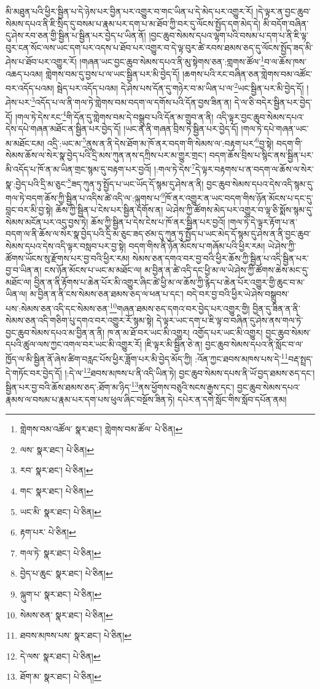 མི་མཐུན་པའི་ཕྱིར་སྦྱིན་པ་དེ་ཉེས་པར་བྱིན་པར་འགྱུར་བ་གང་ཡིན་པ་དེ་མེད་པར་འགྱུར་རོ། །དེ་ལྟར་ན་བྱང་ཆུབ་སེམས་དཔའ་ནི་ཇི་སྲིད་དུ་བསམ་པ་རྣམ་པར་དག་པ་མ་ཐོབ་ཀྱི་བར་དུ་ལོངས་སྤྱོད་དག་མེད་དེ། མི་བདོག་བཞིན་དུ་ཤེས་རབ་ཅན་གྱི་སྦྱིན་པ་སྦྱིན་པར་བྱེད་པ་ཡིན་ནོ། །བྱང་ཆུབ་སེམས་དཔའ་ལྷག་པའི་བསམ་པ་དག་པ་ནི་ཇི་ལྟ་བུར་ངན་སོང་ལས་ཡང་དག་པར་འདས་པ་ཐོབ་པར་འགྱུར་བ་དེ་ལྟ་བུར་ཚེ་རབས་ཐམས་ཅད་དུ་ལོངས་སྤྱོད་ཟད་མི་ཤེས་པ་ཐོབ་པར་འགྱུར་རོ། །གཞན་ཡང་བྱང་ཆུབ་སེམས་དཔའ་ནི་མུ་སྟེགས་ཅན་:གླགས་ཚོལ་\footnote{གླེགས་བམ་འཚོལ་  སྣར་ཐང་། གླེགས་བམ་ཚོལ་  པེ་ཅིན། }བ་ལ་ཆོས་ཁས་འཆད་པའམ། གླེགས་བམ་དུ་བྱས་པ་ལ་ཡང་སྦྱིན་པར་མི་བྱེད་དོ། །ཆགས་པའི་རང་བཞིན་ཅན་གླེགས་བམ་འཚོང་བར་འདོད་པའམ། སྦེད་པར་འདོད་པའམ། དེ་ཤེས་པས་དོན་དུ་གཉེར་བ་མ་ཡིན་པ་ལ་\footnote{ལས་  སྣར་ཐང་།  པེ་ཅིན། }ཡང་སྦྱིན་པར་མི་བྱེད་དོ། །ཤེས་པར་\footnote{རབ་  སྣར་ཐང་།  པེ་ཅིན། }འདོད་པ་ལ་ནི་གལ་ཏེ་གླེགས་བམ་བདག་ལ་དགོས་པའི་དོན་བྱས་ཟིན་ན། དེ་ལ་ཅི་བདེར་སྦྱིན་པར་བྱེད་དོ། །གལ་ཏེ་དེས་རང་\footnote{གང་  སྣར་ཐང་།  པེ་ཅིན། }གི་དོན་དུ་གླེགས་བམ་དེ་བསྒྲུབ་པའི་དོན་མ་གྲུབ་ན་ནི། འདི་ལྟར་བྱང་ཆུབ་སེམས་དཔའ་དེས་དཔེ་གཞན་མཐོང་ན་སྦྱིན་པར་བྱེད་དོ། །ཡང་ན་ནི་གཞན་བྲིས་ཏེ་སྦྱིན་པར་བྱེད་དོ། །གལ་ཏེ་དཔེ་གཞན་ཡང་མ་མཐོང་ངམ། འདྲི་:ཡང་མ་\footnote{ཡང་མི་  སྣར་ཐང་།  པེ་ཅིན། }ནུས་ན་ནི་དེས་ཐོག་མ་ཁོ་ནར་བདག་གི་སེམས་ལ་:བརྟག་པར་\footnote{རྟག་པར་  པེ་ཅིན། }བྱ་སྟེ། བདག་གི་སེམས་ཆོས་ལ་སེར་སྣ་བྱེད་པའི་དྲི་མས་ཀུན་ནས་དཀྲིས་པར་མ་གྱུར་གྲང་། བདག་ཆོས་བྲིས་པ་སྙིང་ནས་སྦྱིན་པར་མི་འདོད་པ་ཁོ་ན་མ་ཡིན་གྲང་སྙམ་དུ་བརྟག་པར་བྱའོ། །:གལ་ཏེ་དེས་\footnote{གལ་ཏེ་  སྣར་ཐང་།  པེ་ཅིན། }དེ་ལྟར་བརྟགས་པ་ན་བདག་ལ་ཆོས་ལ་སེར་སྣ་:བྱེད་པའི་དྲི་མ་ཅུང་\footnote{བྱེད་པ་ཆུང་  སྣར་ཐང་།  པེ་ཅིན། }ཟད་ཀུན་ཏུ་སྤྱོད་པ་ཡང་ཡོད་དོ་སྙམ་དུ་ཤེས་ན་ནི། བྱང་ཆུབ་སེམས་དཔའ་དེས་འདི་སྙམ་དུ་གལ་ཏེ་བདག་ཆོས་ཀྱི་སྦྱིན་པ་འདིས་ཚེ་འདི་ལ་:ལྐུགས་པ་\footnote{ལྐུག་པ་  སྣར་ཐང་།  པེ་ཅིན། }ཁོ་ནར་འགྱུར་ན་ཡང་བདག་གིས་ཉོན་མོངས་པ་དང་དུ་བླང་བར་མི་བྱ་སྟེ། ཆོས་ཀྱི་སྦྱིན་པ་ངེས་པར་སྦྱིན་དགོས་ན། ཡེ་ཤེས་ཀྱི་ཚོགས་མེད་པར་འགྱུར་བ་ལྟ་ཅི་སྨོས་སྙམ་དུ་སེམས་མངོན་པར་འདུ་བྱས་ཏེ། ཆོས་ཀྱི་སྦྱིན་པ་དེས་ངེས་པ་ཁོ་ནར་སྦྱིན་པར་བྱའོ། །གལ་ཏེ་དེ་ལྟར་རྟོག་པ་ན་བདག་ལ་ནི་ཆོས་ལ་སེར་སྣ་བྱེད་པའི་དྲི་མ་ཅུང་ཟད་ཙམ་དུ་ཀུན་ཏུ་སྤྱོད་པ་ཡང་མེད་དོ་སྙམ་དུ་ཤེས་ན་ནི་བྱང་ཆུབ་སེམས་དཔའ་དེས་འདི་ལྟར་བསླབ་པར་བྱ་སྟེ། བདག་གིས་ནི་ཉོན་མོངས་པ་གཞོམ་པའི་ཕྱིར་རམ། ཡེ་ཤེས་ཀྱི་ཚོགས་ཡོངས་སུ་རྫོགས་པར་བྱ་བའི་ཕྱིར་རམ། སེམས་ཅན་དགའ་བར་བྱ་བའི་ཕྱིར་ཆོས་ཀྱི་སྦྱིན་པ་འདི་སྦྱིན་པར་བྱ་བ་ཡིན་ན། ངས་ཉོན་མོངས་པ་ཡང་མ་མཐོང་ལ། མ་བྱིན་ན་ཚེ་འདི་དང་ཕྱི་མ་ལ་ཡེ་ཤེས་ཀྱི་ཚོགས་ཆེས་མང་དུ་མཐོང་ལ། བྱིན་ན་ནི་རྟོགས་པ་ཆེན་པོར་མི་འགྱུར་ཞིང་ཚེ་ཕྱི་མ་ལ་ཆོས་ཀྱི་རྙེད་པ་ཆེན་པོར་འགྱུར་གྱི་ཆུང་བ་མ་ཡིན་ལ། མ་བྱིན་ན་ནི་ངས་སེམས་ཅན་ཐམས་ཅད་ལ་ཕན་པ་དང་། བདེ་བར་བྱ་བའི་ཕྱིར་ཡེ་ཤེས་བསྒྲུབས་པས་:སེམས་ཅན་འདི་དང་སེམས་ཅན་\footnote{སེམས་ཅན་  སྣར་ཐང་།  པེ་ཅིན། }གཞན་ཐམས་ཅད་དགའ་བར་བྱེད་པར་འགྱུར་གྱི། བྱིན་དུ་ཟིན་ན་ནི་སེམས་ཅན་འདི་གཅིག་པུ་དགའ་བར་འགྱུར་རོ་སྙམ་སྟེ། དེ་ལྟར་ཡང་དག་པ་ཇི་ལྟ་བ་བཞིན་དུ་ཤེས་ནས་གལ་ཏེ་བྱང་ཆུབ་སེམས་དཔའ་མ་བྱིན་ན་ནི། ཁ་ན་མ་ཐོ་བར་ཡང་མི་འགྱུར། འགྱོད་པར་ཡང་མི་འགྱུར། བྱང་ཆུབ་སེམས་དཔའི་ཚུལ་ལས་ཀྱང་འགལ་བར་ཡང་མི་འགྱུར་རོ། །ཇི་ལྟར་མི་སྦྱིན་ཅེ་ན། བྱང་ཆུབ་སེམས་དཔའ་ནི་སློང་བ་ལ་ཁྱོད་ལ་མི་སྦྱིན་ནོ་ཞེས་ཚིག་བརླང་པོས་ཕྱིར་ཟློག་པར་མི་བྱེད་མོད་ཀྱི། :འོན་ཀྱང་ཐབས་མཁས་པས་དེ་\footnote{ཐབས་མཁས་པས་  སྣར་ཐང་།  པེ་ཅིན། }བརྡ་སྤྲད་དེ་གཏོང་བར་བྱེད་དོ། །:དེ་ལ་\footnote{དེ་ལས་  སྣར་ཐང་།  པེ་ཅིན། }ཐབས་མཁས་པ་ནི་འདི་ཡིན་ཏེ། བྱང་ཆུབ་སེམས་དཔས་ནི་ཡོ་བྱད་ཐམས་ཅད་དང་། སྦྱིན་པར་བྱ་བའི་ཆོས་ཐམས་ཅད་:ཐོག་མ་ཉིད་\footnote{ཐོག་མ་  སྣར་ཐང་།  པེ་ཅིན། }ནས་ཕྱོགས་བཅུའི་སངས་རྒྱས་དང་། བྱང་ཆུབ་སེམས་དཔའ་རྣམས་ལ་བསམ་པ་རྣམ་པར་དག་པས་ཕུལ་ཞིང་བསྔོས་ཟིན་ཏེ། དཔེར་ན་དགེ་སློང་གིས་སློབ་དཔོན་ནམ། 